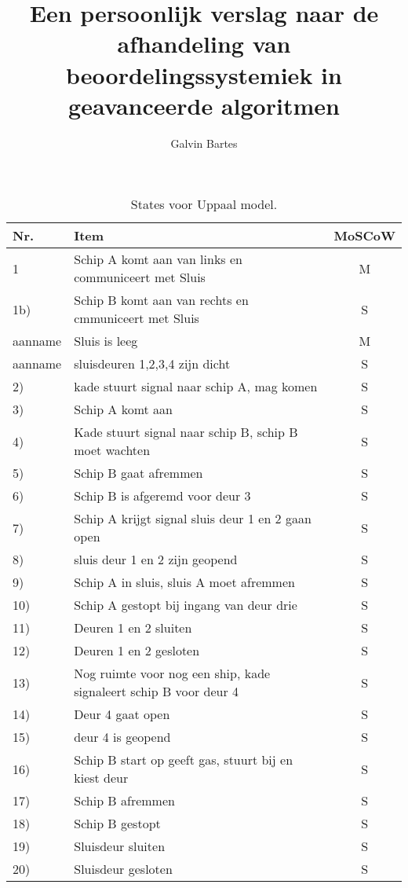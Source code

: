 \documentclass[a4paper,12pt]{article}
\begin{document}
\title{Een persoonlijk verslag naar de afhandeling van beoordelingssystemiek in geavanceerde algoritmen}
\author{Galvin Bartes}
\maketitle
\tableofcontents
\begin{table}[h] %
\caption{States voor Uppaal model.} %
\label{reqs} %
\begin{center} %
\begin{tabular}{llc} %
\hline %
\textbf{Nr.} & \textbf{Item} & \textbf{MoSCoW}\\ %
\hline
1 & Schip A komt aan van links en communiceert met Sluis & M\\
1b) & Schip B komt aan van rechts en cmmuniceert met Sluis & S\\
aanname & Sluis is leeg & M\\
aanname & sluisdeuren 1,2,3,4 zijn dicht & S\\
2) & kade stuurt signal naar schip A, mag komen & S\\
3) & Schip A komt aan & S\\
4) & Kade stuurt signal naar schip B, schip B moet wachten & S\\
5) & Schip B gaat afremmen & S\\
6) & Schip B is afgeremd voor deur 3 & S\\
7) & Schip A krijgt signal sluis deur 1 en 2 gaan open & S\\
8) & sluis deur 1 en 2 zijn geopend & S\\
9) & Schip A in sluis, sluis A moet afremmen & S\\
10) & Schip A gestopt bij ingang van deur drie & S\\
11) & Deuren 1 en 2 sluiten & S\\
12) & Deuren 1 en 2 gesloten & S\\
13) & Nog ruimte voor nog een ship, kade signaleert schip B voor deur 4 & S\\
14) & Deur 4 gaat open & S\\
15) & deur 4 is geopend & S\\
16) & Schip B start op geeft gas, stuurt bij en kiest deur & S\\
17) & Schip B afremmen & S\\
18) & Schip B gestopt & S\\

19) & Sluisdeur sluiten & S\\
20) & Sluisdeur gesloten & S\\

\hline
\end{tabular}
\end{center}
\end{table}
\end{document}
